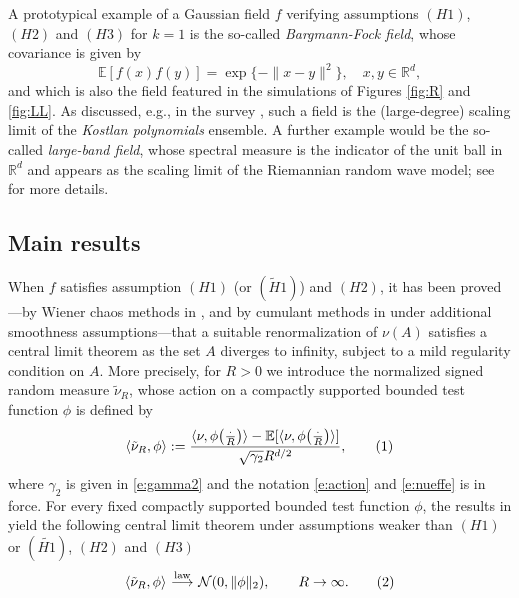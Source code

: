 \documentclass[11pt,a4paper]{article}
\newcommand\R{\mathbb{R}}
\newcommand\E{\mathbb{E}}
\newcommand\nut{\tilde{\nu}}
\newcommand\numberthis{\addtocounter{equation}{1}\tag{\theequation}}
\newcommand\jump{\par\medskip}
\numberwithin{equation}{section}
\theoremstyle{plain}
\theoremstyle{plain}
\theoremstyle{plain}
\theoremstyle{plain}
\theoremstyle{definition}
\theoremstyle{definition}
\begin{document}
\medskip

A prototypical example of a Gaussian field $f$ verifying assumptions $(H1)$, $(H2)$ and $(H3)$ for $k=1$ is the so-called {\it Bargmann-Fock field}, whose covariance is given by
\begin{equation}\label{e:BF}
\mathbb{E}[f(x)f(y)]= \exp\{ -\|x-y\|^2\}, \quad x,y\in \R^d,
\end{equation}
and which is also the field featured in the simulations of Figures \ref{fig:R} and \ref{fig:LL}. As discussed, e.g., in the survey \cite{Nalini}, such a field is the (large-degree) scaling limit of the {\it Kostlan polynomials} ensemble. A further example would be the so-called {\it large-band field}, whose spectral measure is the indicator of the unit ball in $\R^d$ and appears as the scaling limit of the Riemannian random wave model; see \cite{GassBer} for more details.


\jump






\subsection{Main results}
When $f$ satisfies assumption $(H1)$ (or $(\widetilde{H}1)$) and $(H2)$, 
it has been proved---by Wiener chaos methods in \cite[Thm 1.7]{Gas25}, 
and by cumulant methods in \cite[Thm. 1.9]{Anc24} under additional smoothness assumptions---that 
a suitable renormalization of $\nu(A)$ satisfies a central limit theorem as the set $A$ diverges to infinity, subject to a mild regularity condition on $A$. More precisely, for $R>0$ we introduce the normalized signed random measure $\nut_R$, whose action on a compactly supported bounded test function $\phi$ is defined by
\[
\langle \nut_R,\phi\rangle
:= \frac{\langle \nu,\phi\!\left(\frac{\cdot}{R}\right)\rangle - 
\E[\langle \nu,\phi\!\left(\frac{\cdot}{R}\right)\rangle]}
{\sqrt{\gamma_2}R^{d/2}},\numberthis\label{eq:04}
\]
where $\gamma_2$ is given in \eqref{e:gamma2} and the notation \eqref{e:action} and \eqref{e:nueffe} is in force. For every fixed compactly supported bounded test function $\phi$, the results in 
\cite[Thm. 1.7]{Gas25} yield the following central limit theorem under assumptions weaker than $(H1)$ or $(\widetilde{H1})$, $(H2)$ and $(H3)$
\[
\langle \nut_R,\phi\rangle 
\,\,{\overset{{\rm law}}{\longrightarrow}}\,\, 
\mathcal{N}(0,\|\phi\|_2),
\qquad R\to\infty.\numberthis\label{eq:01}
\]

\smallskip
\end{document}
